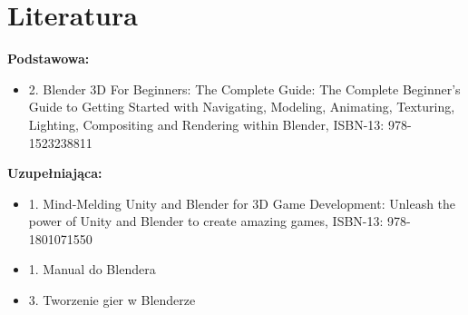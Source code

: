 \documentclass[12pt, a4paper]{article}
\begin{document}
\section{Literatura}

\textbf{Podstawowa:}
\begin{itemize}
  \item 2. Blender 3D For Beginners: The Complete Guide: The Complete Beginner’s Guide to Getting Started with Navigating, Modeling, Animating, Texturing, Lighting, Compositing and Rendering within Blender, ISBN-13: 978-1523238811
\end{itemize}

\textbf{Uzupełniająca:}
\begin{itemize}
  \item 1. Mind-Melding Unity and Blender for 3D Game Development: Unleash the power of Unity and Blender to create amazing games, ISBN-13: 978-1801071550
  \item 1. Manual do Blendera
  \item 3. Tworzenie gier w Blenderze
\end{itemize}
\end{document}
